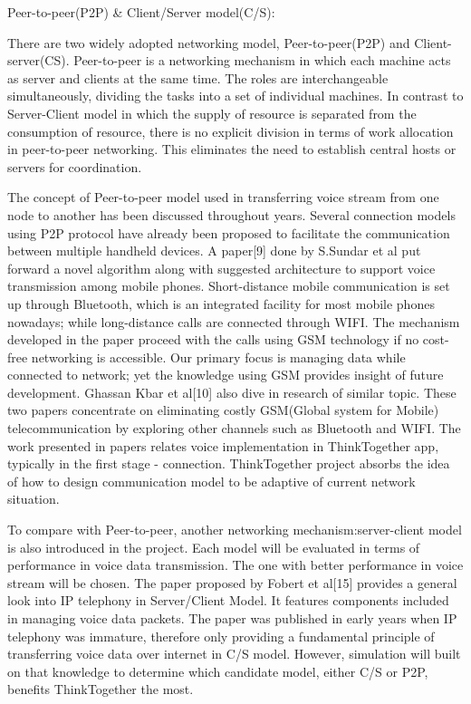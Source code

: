 Peer-to-peer(P2P) \& Client/Server model(C/S):

There are two widely adopted networking model, Peer-to-peer(P2P) and Client-server(CS). Peer-to-peer is a networking mechanism in which each machine acts as server and clients at the same time. The roles are interchangeable simultaneously, dividing the tasks into a set of individual machines. In contrast to Server-Client model in which the supply of resource is separated from the consumption of resource, there is no explicit division in terms of work allocation in peer-to-peer networking. This eliminates the need to establish central hosts or servers for coordination. 

The concept of Peer-to-peer model used in transferring voice stream from one node to another has been discussed throughout years. Several connection models using P2P protocol have already been proposed to facilitate the communication between multiple handheld devices. A paper[9] done by S.Sundar et al put forward a novel algorithm along with suggested architecture to support voice transmission among mobile phones. Short-distance mobile communication is set up through Bluetooth, which is an integrated facility for most mobile phones nowadays; while long-distance calls are connected through WIFI. The mechanism developed in the paper proceed with the calls using GSM technology if no cost-free networking is accessible. Our primary focus is managing data while connected to network; yet the knowledge using GSM provides insight of future development. Ghassan Kbar et al[10] also dive in  research of similar topic. These two papers concentrate on eliminating costly GSM(Global system for Mobile) telecommunication by exploring other channels such as Bluetooth and WIFI. The work presented in papers relates voice implementation in ThinkTogether app, typically in the first stage - connection. ThinkTogether project absorbs the idea of how to design communication model to be adaptive of current network situation. 

To compare with Peer-to-peer, another networking mechanism:server-client model is also introduced in the project. Each model will be evaluated in terms of performance in voice data transmission. The one with better performance in voice stream will be chosen. The paper proposed by Fobert et al[15] provides a general look into IP telephony in Server/Client Model. It features components included in managing voice data packets. The paper was published in early years when IP telephony was immature, therefore only providing a fundamental principle of transferring voice data over internet in C/S model. However, simulation will built on that knowledge to determine which candidate model, either C/S or P2P, benefits ThinkTogether the most. 





